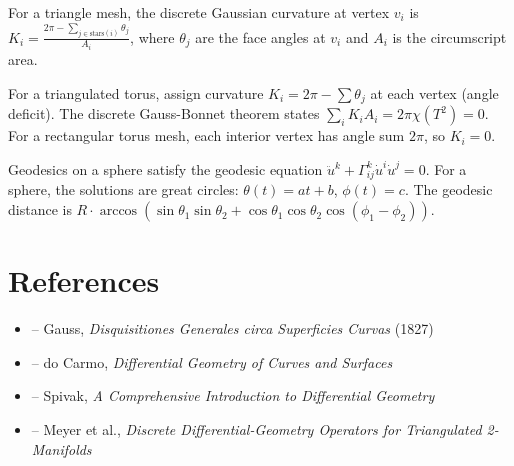 \begin{solution}
For a triangle mesh, the discrete Gaussian curvature at vertex $v_i$ is $K_i = \frac{2\pi - \sum_{j \in \text{stars}(i)} \theta_j}{A_i}$, where $\theta_j$ are the face angles at $v_i$ and $A_i$ is the circumscript area.
\end{solution}

\begin{solution}
For a triangulated torus, assign curvature $K_i = 2\pi - \sum \theta_j$ at each vertex (angle deficit). The discrete Gauss-Bonnet theorem states $\sum_i K_i A_i = 2\pi\chi(T^2) = 0$. For a rectangular torus mesh, each interior vertex has angle sum $2\pi$, so $K_i = 0$.
\end{solution}

\begin{solution}
Geodesics on a sphere satisfy the geodesic equation $\ddot{u}^k + \Gamma_{ij}^k \dot{u}^i \dot{u}^j = 0$. For a sphere, the solutions are great circles: $\theta(t) = at + b$, $\phi(t) = c$. The geodesic distance is $R \cdot \arccos(\sin\theta_1\sin\theta_2 + \cos\theta_1\cos\theta_2\cos(\phi_1-\phi_2))$.
\end{solution}


\section{References}

\begin{itemize}
    \item \cite{gauss-disquisitiones-generales} -- Gauss, \textit{Disquisitiones Generales circa Superficies Curvas} (1827)
    \item \cite{do-carmo} -- do Carmo, \textit{Differential Geometry of Curves and Surfaces}
    \item \cite{spivak-dg} -- Spivak, \textit{A Comprehensive Introduction to Differential Geometry}
    \item \cite{meyer-discrete} -- Meyer et al., \textit{Discrete Differential-Geometry Operators for Triangulated 2-Manifolds}
\end{itemize}
